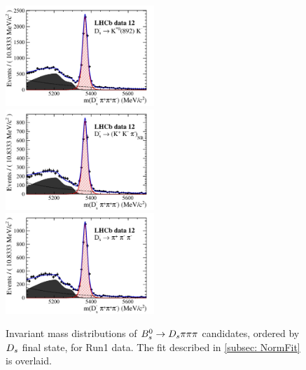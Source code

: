 \begin{figure}[h]
\includegraphics[height=!,width=0.5\textwidth]{figs/norm_y12_KsK.pdf}
\includegraphics[height=!,width=0.5\textwidth]{figs/norm_y12_KKpi_NR.pdf}
\includegraphics[height=!,width=0.5\textwidth]{figs/norm_y12_pipipi.pdf}
\caption{Invariant mass distributions of ${{B}^0_{s}}\rightarrow{\ensuremath{{D}_{s}}}{\ensuremath{\pi}}{\ensuremath{\pi}}{\ensuremath{\pi}}$ candidates, ordered by ${{D}_{s}}$ final state, for Run1 data.
The fit described in \ref{subsec: NormFit} is overlaid.}
\label{fig:massfits_norm_Run1}
\end{figure}

\clearpage

